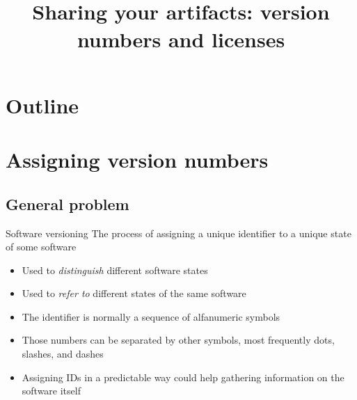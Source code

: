 \documentclass[presentation]{beamer}
\title[03 - Dependency Management]{ \\
\normalsize{Sharing your artifacts: version numbers and licenses}}
\begin{document}

\frame[label=coverpage]{\titlepage}

\section*{Outline}

\frame{\tableofcontents}



\section{Assigning version numbers}

\subsection{General problem}

\begin{frame}{Software versioning}
    The process of assigning a unique identifier to a unique state of some software
    \begin{itemize}
        \item Used to \textit{distinguish} different software states
        \item Used to \textit{refer to} different states of the same software
        \item The identifier is normally a sequence of alfanumeric symbols
        \item Those numbers can be separated by other symbols, most frequently dots, slashes, and dashes
        \item Assigning IDs in a predictable way could help gathering information on the software itself
    \end{itemize}
\end{frame}
\end{document}
